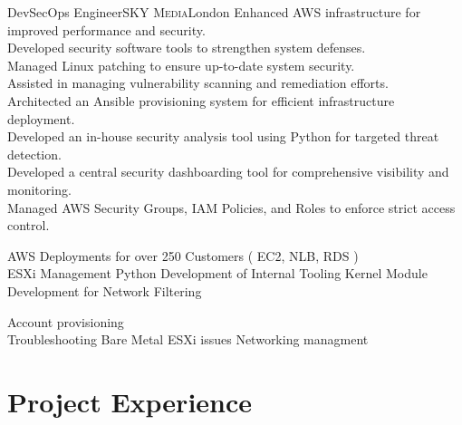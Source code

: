 \documentclass[10pt,a4paper,sans]{moderncv} %
\begin{document}
 {DevSecOps Engineer}{\textsc{SKY Media}}{London}{}
{
	Enhanced AWS infrastructure for improved performance and security.\\
	Developed security software tools to strengthen system defenses.\\
	Managed Linux patching to ensure up-to-date system security.\\
	Assisted in managing vulnerability scanning and remediation efforts.\\
	Architected an Ansible provisioning system for efficient infrastructure deployment.\\
	Developed an in-house security analysis tool using Python for targeted threat detection.\\
	Developed a central security dashboarding tool for comprehensive visibility and monitoring.\\
	Managed AWS Security Groups, IAM Policies, and Roles to enforce strict access control.\\
}

{
	AWS Deployments for over 250 Customers ( EC2, NLB, RDS )\\
	ESXi Management
	Python Development of Internal Tooling
	Kernel Module Development for Network Filtering\\
}

{
	Account provisioning\\
	Troubleshooting Bare Metal ESXi issues
	Networking managment\\
}

\section*{Project Experience}

\end{document}
